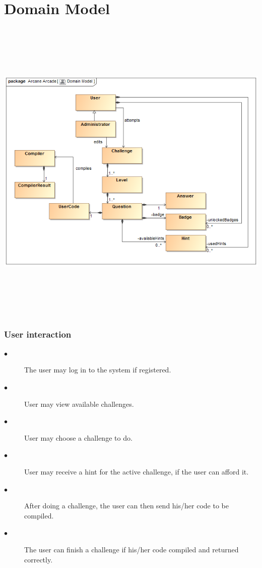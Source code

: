 \documentclass[english]{article}
\begin{document}
		\section{Domain Model}
		 \includegraphics[width=15cm,height=15cm,keepaspectratio]{domainModel v2.png}
	\iffalse	
		\subsubsection{User interaction}
		\begin{description}
			\item[$\bullet$] The user may log in to the system if registered.
			\item[$\bullet$] User may view available challenges.
			\item[$\bullet$] User may choose a challenge to do.
			\item[$\bullet$] User may receive a hint for the active challenge, if the user can afford it.
			\item[$\bullet$] After doing a challenge, the user can then send his/her code to be compiled.
			\item[$\bullet$] The user can finish a challenge if his/her code compiled and returned correctly.
		\end{description}
		
\end{document}
